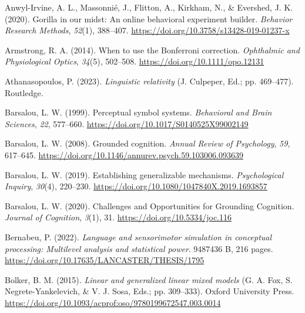 \documentclass[
  man,floatsintext]{apa7}
\newlength{\cslhangindent}
\newlength{\cslentryspacingunit} %
\newenvironment{CSLReferences}[2] %
 {%
  \setlength{\parindent}{0pt}
  \ifodd #1
  \let\oldpar\par
  \def\par{\hangindent=\cslhangindent\oldpar}
  \fi
  \setlength{\parskip}{#2\cslentryspacingunit}
 }%
 {}
\begin{document}
\hypertarget{refs}{}
\begin{CSLReferences}{1}{0}
\leavevmode{}%
Anwyl-Irvine, A. L., Massonnié, J., Flitton, A., Kirkham, N., \& Evershed, J. K. (2020). Gorilla in our midst: {An} online behavioral experiment builder. \emph{Behavior Research Methods}, \emph{52}(1), 388--407. \url{https://doi.org/10.3758/s13428-019-01237-x}

\leavevmode{}%
Armstrong, R. A. (2014). When to use the {Bonferroni} correction. \emph{Ophthalmic and Physiological Optics}, \emph{34}(5), 502--508. \url{https://doi.org/10.1111/opo.12131}

\leavevmode{}%
Athanasopoulos, P. (2023). \emph{Linguistic relativity} (J. Culpeper, Ed.; pp. 469--477). Routledge.

\leavevmode{}%
Barsalou, L. W. (1999). Perceptual symbol systems. \emph{Behavioral and Brain Sciences}, \emph{22}, 577--660. \url{https://doi.org/10.1017/S0140525X99002149}

\leavevmode{}%
Barsalou, L. W. (2008). Grounded cognition. \emph{Annual Review of Psychology}, \emph{59}, 617--645. \url{https://doi.org/10.1146/annurev.psych.59.103006.093639}

\leavevmode{}%
Barsalou, L. W. (2019). Establishing generalizable mechanisms. \emph{Psychological Inquiry}, \emph{30}(4), 220--230. \url{https://doi.org/10.1080/1047840X.2019.1693857}

\leavevmode{}%
Barsalou, L. W. (2020). Challenges and Opportunities for Grounding Cognition. \emph{Journal of Cognition}, \emph{3}(1), 31. \url{https://doi.org/10.5334/joc.116}

\leavevmode{}%
Bernabeu, P. (2022). \emph{Language and sensorimotor simulation in conceptual processing: Multilevel analysis and statistical power}. 9487436 B, 216 pages. \url{https://doi.org/10.17635/LANCASTER/THESIS/1795}

\leavevmode{}%
Bolker, B. M. (2015). \emph{Linear and generalized linear mixed models} (G. A. Fox, S. Negrete-Yankelevich, \& V. J. Sosa, Eds.; pp. 309--333). Oxford University Press. \url{https://doi.org/10.1093/acprof:oso/9780199672547.003.0014}


\end{CSLReferences}
\end{document}
